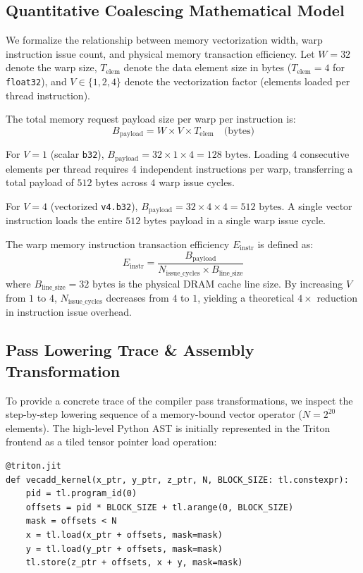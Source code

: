 \documentclass[10pt,journal,compsoc]{IEEEtran}
\begin{document}
\subsection{Quantitative Coalescing Mathematical Model}
We formalize the relationship between memory vectorization width, warp instruction issue count, and physical memory transaction efficiency. Let $W = 32$ denote the warp size, $T_{\text{elem}}$ denote the data element size in bytes ($T_{\text{elem}} = 4$ for \texttt{float32}), and $V \in \{1, 2, 4\}$ denote the vectorization factor (elements loaded per thread instruction).

The total memory request payload size per warp per instruction is:
\begin{equation}
B_{\text{payload}} = W \times V \times T_{\text{elem}} \quad \text{(bytes)}
\end{equation}

For $V=1$ (scalar \texttt{b32}), $B_{\text{payload}} = 32 \times 1 \times 4 = 128\text{ bytes}$. Loading 4 consecutive elements per thread requires $4$ independent instructions per warp, transferring a total payload of $512\text{ bytes}$ across $4$ warp issue cycles.

For $V=4$ (vectorized \texttt{v4.b32}), $B_{\text{payload}} = 32 \times 4 \times 4 = 512\text{ bytes}$. A single vector instruction loads the entire $512\text{ bytes}$ payload in a single warp issue cycle.

The warp memory instruction transaction efficiency $E_{\text{instr}}$ is defined as:
\begin{equation}
E_{\text{instr}} = \frac{B_{\text{payload}}}{N_{\text{issue\_cycles}} \times B_{\text{line\_size}}}
\end{equation}
where $B_{\text{line\_size}} = 32\text{ bytes}$ is the physical DRAM cache line size. By increasing $V$ from $1$ to $4$, $N_{\text{issue\_cycles}}$ decreases from $4$ to $1$, yielding a theoretical $4\times$ reduction in instruction issue overhead.


\subsection{Pass Lowering Trace & Assembly Transformation}
To provide a concrete trace of the compiler pass transformations, we inspect the step-by-step lowering sequence of a memory-bound vector operator ($N = 2^{20}$ elements). The high-level Python AST is initially represented in the Triton frontend as a tiled tensor pointer load operation:
\begin{lstlisting}
@triton.jit
def vecadd_kernel(x_ptr, y_ptr, z_ptr, N, BLOCK_SIZE: tl.constexpr):
    pid = tl.program_id(0)
    offsets = pid * BLOCK_SIZE + tl.arange(0, BLOCK_SIZE)
    mask = offsets < N
    x = tl.load(x_ptr + offsets, mask=mask)
    y = tl.load(y_ptr + offsets, mask=mask)
    tl.store(z_ptr + offsets, x + y, mask=mask)
\end{lstlisting}
\end{document}
